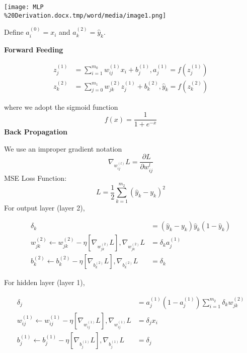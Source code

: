 \documentclass{scrbook}
\begin{document}
\texttt{[image: MLP\\\%20Derivation.docx.tmp/word/media/image1.png]}

Define ${a}_{i}^{\left(0\right)}=x_{i}$ and ${a}_{k}^{\left(2\right)}=\hat{y}_{k}$.

\textbf{Forward Feeding}

\begin{align*}
{z}_{j}^{\left(1\right)}&={\sum }_{i=1}^{m_{0}}{w}_{ij}^{\left(1\right)}x_{i}+{b}_{j}^{\left(1\right)}, {a}_{j}^{\left(1\right)}=f\left({z}_{j}^{\left(1\right)}\right) \\
{z}_{k}^{\left(2\right)}&={\sum }_{j=0}^{m_{1}}{w}_{jk}^{\left(2\right)}{z}_{j}^{\left(1\right)}+{b}_{k}^{\left(2\right)}, \hat{y}_{k}=f\left({z}_{k}^{\left(2\right)}\right) 
\end{align*}

where we adopt the sigmoid function
\begin{equation*}
f\left(x\right)=\frac{1}{1+e^{-x}}
\end{equation*}
\textbf{Back Propagation}

We use an improper gradient notation
\begin{equation*}
\nabla _{{w}_{ij}^{\left(l\right)}}L=\frac{\partial L}{\partial {w}_{ij}^{l}}
\end{equation*}
MSE Loss Function:
\begin{equation*}
L=\frac{1}{2}{\sum }_{k=1}^{m_{2}}\left(\hat{y}_{k}-y_{k}\right)^{2}
\end{equation*}
For output layer (layer 2),

\begin{align*}
\delta _{k}&=\left(\hat{y}_{k}-y_{k}\right)\hat{y}_{k}\left(1-\hat{y}_{k}\right) \\
{w}_{jk}^{\left(2\right)}\leftarrow {w}_{jk}^{\left(2\right)}-\eta \left[\nabla _{{w}_{jk}^{\left(2\right)}}L\right], \nabla _{{w}_{jk}^{\left(2\right)}}L&=\delta _{k}{a}_{j}^{\left(1\right)} \\
{b}_{k}^{\left(2\right)}\leftarrow {b}_{k}^{\left(2\right)}-\eta \left[\nabla _{{b}_{k}^{\left(2\right)}}L\right], \nabla _{{b}_{k}^{\left(2\right)}}L&=\delta _{k} 
\end{align*}

For hidden layer (layer 1),

\begin{align*}
\delta _{j}&={a}_{j}^{\left(1\right)}\left(1-{a}_{j}^{\left(1\right)}\right){\sum }_{i=1}^{m_{2}}\delta _{k}{w}_{jk}^{\left(2\right)} \\
{w}_{ij}^{\left(1\right)}\leftarrow {w}_{ij}^{\left(1\right)}-\eta \left[\nabla _{{w}_{ij}^{\left(1\right)}}L\right], \nabla _{{w}_{ij}^{\left(1\right)}}L&=\delta _{j}x_{i} \\
{b}_{j}^{\left(1\right)}\leftarrow {b}_{j}^{\left(1\right)}-\eta \left[\nabla _{{b}_{j}^{\left(1\right)}}L\right], \nabla _{{b}_{j}^{\left(1\right)}}L&=\delta _{j} 
\end{align*}
\end{document}
